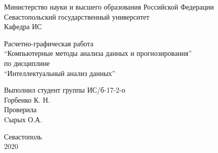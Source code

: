 \begin{titlepage}
    \thispagestyle{empty}
    
    \begin{center}
        
        Министерство науки и высшего образования Российской Федерации \\
        Севастопольский государственный университет \\
        Кафедра ИС
        
        \vfill

        Расчетно-графическая работа \\
        \enquote{Компьютерные методы анализа данных и прогнозирования} \\
        по дисциплине \\
        \enquote{Интеллектуальный анализ данных}

    \end{center}

    \vspace{1cm}

    \noindent\hspace{7.5cm} Выполнил студент группы ИС/б-17-2-о \\
    \null\hspace{7.5cm} Горбенко К. Н. \\
    \null\hspace{7.5cm} Проверила \\
    \null\hspace{7.5cm} Cырых О.А.

    \vfill

    \begin{center}
        Севастополь \\
        2020
    \end{center}

\end{titlepage}